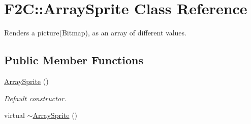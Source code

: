 \hypertarget{class_f2_c_1_1_array_sprite}{
\section{F2C::ArraySprite Class Reference}
\label{class_f2_c_1_1_array_sprite}
}


Renders a picture(Bitmap), as an array of different values.  


\subsection*{Public Member Functions}
\begin{DoxyCompactItemize}
\item 
\hypertarget{class_f2_c_1_1_array_sprite_a084edc3ab72ab882178673283e2ebb91}{
\hyperlink{class_f2_c_1_1_array_sprite_a084edc3ab72ab882178673283e2ebb91}{ArraySprite} ()}
\label{class_f2_c_1_1_array_sprite_a084edc3ab72ab882178673283e2ebb91}

\begin{DoxyCompactList}\small\item\em Default constructor. \item\end{DoxyCompactList}\item 
\hypertarget{class_f2_c_1_1_array_sprite_ae0dbb28d0a85e7de503d704fd22c0451}{
virtual \hyperlink{class_f2_c_1_1_array_sprite_ae0dbb28d0a85e7de503d704fd22c0451}{$\sim$ArraySprite} ()}
\label{class_f2_c_1_1_array_sprite_ae0dbb28d0a85e7de503d704fd22c0451}


\end{DoxyCompactItemize}
